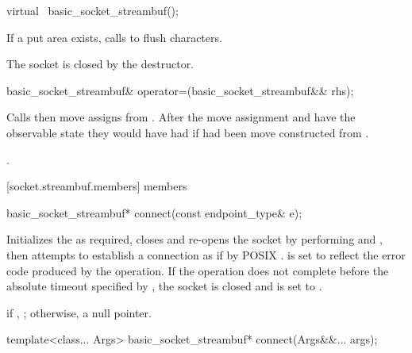 \begin{itemdecl}
virtual ~basic_socket_streambuf();
\end{itemdecl}

\begin{itemdescr}
\pnum
\effects If a put area exists, calls  to flush characters. \begin{note} The socket is closed by the  destructor. \end{note}
\end{itemdescr}

\begin{itemdecl}
basic_socket_streambuf& operator=(basic_socket_streambuf&& rhs);
\end{itemdecl}

\begin{itemdescr}
\pnum
\effects Calls  then move assigns from .
After the move assignment  and  have the observable state
they would have had if  had been move constructed from .

\pnum
\returns {}.
\end{itemdescr}



[socket.streambuf.members]{ members}

\begin{itemdecl}
basic_socket_streambuf* connect(const endpoint_type& e);
\end{itemdecl}

\begin{itemdescr}
\pnum
\effects Initializes the  as required, closes and re-opens the socket by performing  and , then attempts to establish a connection as if by POSIX .  is set to reflect the error code produced by the operation. If the operation does not complete before the absolute timeout specified by , the socket is closed and  is set to .

\pnum
\returns if , ; otherwise, a null pointer.
\end{itemdescr}

\begin{itemdecl}
template<class... Args>
  basic_socket_streambuf* connect(Args&&... args);
\end{itemdecl}

